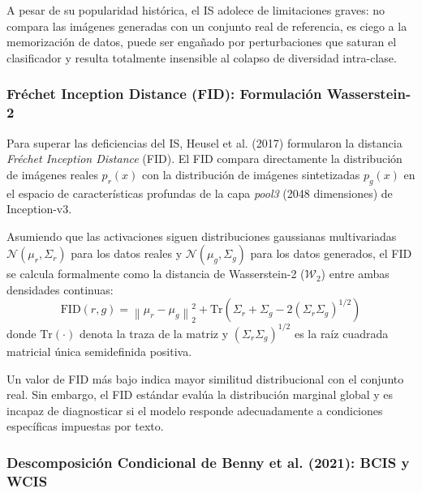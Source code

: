 A pesar de su popularidad histórica, el IS adolece de limitaciones graves: no compara las imágenes generadas con un conjunto real de referencia, es ciego a la memorización de datos, puede ser engañado por perturbaciones que saturan el clasificador y resulta totalmente insensible al colapso de diversidad intra-clase.

\subsubsection{Fréchet Inception Distance (FID): Formulación Wasserstein-2}

Para superar las deficiencias del IS, Heusel et al. (2017) formularon la distancia \textit{Fréchet Inception Distance} (FID). El FID compara directamente la distribución de imágenes reales $p_r(x)$ con la distribución de imágenes sintetizadas $p_g(x)$ en el espacio de características profundas de la capa \textit{pool3} (2048 dimensiones) de Inception-v3.

Asumiendo que las activaciones siguen distribuciones gaussianas multivariadas $\mathcal{N}(\mu_r, \Sigma_r)$ para los datos reales y $\mathcal{N}(\mu_g, \Sigma_g)$ para los datos generados, el FID se calcula formalmente como la distancia de Wasserstein-2 ($\mathcal{W}_2$) entre ambas densidades continuas:
\begin{equation}
\mathrm{FID}(r, g) = \left\| \mu_r - \mu_g \right\|_2^2 + \mathrm{Tr}\left( \Sigma_r + \Sigma_g - 2 \left( \Sigma_r \Sigma_g \right)^{1/2} \right)
\end{equation}
donde $\mathrm{Tr}(\cdot)$ denota la traza de la matriz y $(\Sigma_r \Sigma_g)^{1/2}$ es la raíz cuadrada matricial única semidefinida positiva.

Un valor de FID más bajo indica mayor similitud distribucional con el conjunto real. Sin embargo, el FID estándar evalúa la distribución marginal global y es incapaz de diagnosticar si el modelo responde adecuadamente a condiciones específicas impuestas por texto.

\subsubsection{Descomposición Condicional de Benny et al. (2021): BCIS y WCIS}

